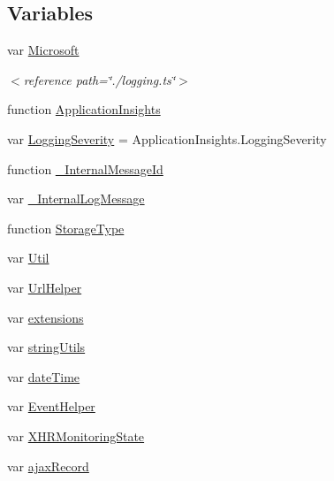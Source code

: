 \subsection*{Variables}
\begin{DoxyCompactItemize}
\item 
var \hyperlink{_scripts_2ai_80_822_89-build00167_8js_a346f48e65cfff7589049e855265d5054}{Microsoft}
\begin{DoxyCompactList}\small\item\em $<$reference path=\char`\"{}./logging.\+ts\char`\"{}$>$ \end{DoxyCompactList}\item 
function \hyperlink{_scripts_2ai_80_822_89-build00167_8js_aa415ef4f8cdd699689ef4b61db7656d8}{Application\+Insights}
\item 
var \hyperlink{_scripts_2ai_80_822_89-build00167_8js_a7c9dc87e469261dd3cdf56090107bebc}{Logging\+Severity} = Application\+Insights.\+Logging\+Severity
\item 
function \hyperlink{_scripts_2ai_80_822_89-build00167_8js_aa4ededc59642ec3e9597dfcf82b22e85}{\+\_\+\+Internal\+Message\+Id}
\item 
var \hyperlink{_scripts_2ai_80_822_89-build00167_8js_aa8db6bc3fe99dd546c9bb97c6c7e4cb8}{\+\_\+\+Internal\+Log\+Message}
\item 
function \hyperlink{_scripts_2ai_80_822_89-build00167_8js_a48773dc305f9a6b59e02732bccf539e9}{Storage\+Type}
\item 
var \hyperlink{_scripts_2ai_80_822_89-build00167_8js_adf40173670f3e2786a0ef699f8b1d965}{Util}
\item 
var \hyperlink{_scripts_2ai_80_822_89-build00167_8js_a472b4d284dd284842438e13abaf8e3a3}{Url\+Helper}
\item 
var \hyperlink{_scripts_2ai_80_822_89-build00167_8js_a9ce4e17b92e5debce1c72727f3bdd551}{extensions}
\item 
var \hyperlink{_scripts_2ai_80_822_89-build00167_8js_a89651b896296468ad2af0726858df446}{string\+Utils}
\item 
var \hyperlink{_scripts_2ai_80_822_89-build00167_8js_afd39fa7d65e0546040b5b0efd5247ada}{date\+Time}
\item 
var \hyperlink{_scripts_2ai_80_822_89-build00167_8js_ab68a52b33466abbf486cdf84371fca0f}{Event\+Helper}
\item 
var \hyperlink{_scripts_2ai_80_822_89-build00167_8js_a4f771bfa65091853b832d27ff5e9c716}{X\+H\+R\+Monitoring\+State}
\item 
var \hyperlink{_scripts_2ai_80_822_89-build00167_8js_a7cd47fdf5f914d968bcb1c0bd808b2a5}{ajax\+Record}

\end{DoxyCompactItemize}
